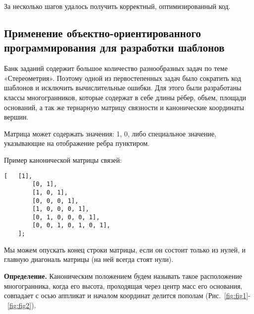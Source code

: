 За несколько шагов удалось получить корректный, оптимизированный код.

\subsection{Применение объектно-ориентированного программирования для разработки шаблонов}

Банк заданий содержит большое количество разнообразных задач по теме «Стереометрия». Поэтому одной из первостепенных задач было сократить код шаблонов и исключить вычислительные ошибки. Для этого были разработаны классы многогранников, которые содержат в себе длины рёбер, объем, площади оснований, а так же тернарную матрицу связности и канонические координаты вершин.

Матрица может содержать значения: 1, 0, либо специальное значение, указывающие на отображение ребра пунктиром.

Пример канонической матрицы связей:

\begin{lstlisting}[caption = {Каноническая матрица связей для параллелепипеда}]
	[   [1],
	    [0, 1],
	    [1, 0, 1],
	    [0, 0, 0, 1],
	    [1, 0, 0, 0, 1],
	    [0, 1, 0, 0, 0, 1],
	    [0, 0, 1, 0, 1, 0, 1],
	];
\end{lstlisting}

Мы можем опускать конец строки матрицы, если он состоит только из нулей, и главную диагональ матрицы (на ней всегда стоят нули).

\textbf{Определение.} Каноническим положением будем называть такое расположение многогранника, когда его высота, проходящая через центр масс его основания, совпадает с осью аппликат и началом координат делится пополам (Рис.~\ref{fig:fig1}-~\ref{fig:fig2}).


